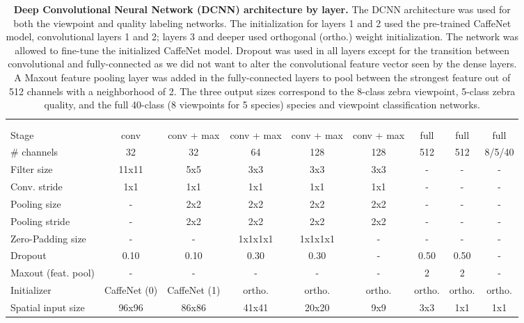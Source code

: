 \begin{table}[!ht]
	\centering
    	\resizebox{\linewidth}{!}
	{
		\begin{tabular}{l|ccccc|cc|c}
			    \hline
			    & & & & & & & & \head{Output} \\
			    \head{Layer} & \head{1} & \head{2} & \head{3} & \head{4} & \head{5} & \head{6} & \head{7} & \head{8} \\
			    \hline
			    Stage & conv & conv + max & conv + max & conv + max & conv + max & full & full & full \\
			    \# channels & 32 & 32 & 64 & 128 & 128 & 512 & 512 & 8/5/40 \\
			    Filter size & 11x11 & 5x5 & 3x3 & 3x3 & 3x3 & - & - & - \\
			    Conv. stride & 1x1 & 1x1 & 1x1 & 1x1 & 1x1 & - & - & - \\
			    Pooling size & - & 2x2 & 2x2 & 2x2 & 2x2 & - & - & - \\
			    Pooling stride & - & 2x2 & 2x2 & 2x2 & 2x2 & - & - & - \\
			    Zero-Padding size & - & - & 1x1x1x1 & 1x1x1x1 & - & - & - & - \\
			    Dropout & 0.10 & 0.10 & 0.30 & 0.30 & - & 0.50 & 0.50 & - \\
			    Maxout (feat. pool) & - & - & - & - & - & 2 & 2 & - \\
			    Initializer & CaffeNet (0) & CaffeNet (1) & ortho. & ortho. & ortho. & ortho. & ortho. & ortho. \\
			    \hline
			    Spatial input size & 96x96 & 86x86 & 41x41 & 20x20 & 9x9 & 3x3 & 1x1 & 1x1 \\
		\end{tabular}
	}
    	\caption[Deep Convolutional Neural Network (DCNN) Architecture by Layer]{\textbf{Deep Convolutional Neural Network (DCNN) architecture by layer.}  The DCNN architecture was used for both the viewpoint and quality labeling networks.  The initialization for layers 1 and 2 used the pre-trained CaffeNet model, convolutional layers 1 and 2; layers 3 and deeper used orthogonal (ortho.) weight initialization.  The network was allowed to fine-tune the initialized CaffeNet model.  Dropout was used in all layers except for the transition between convolutional and fully-connected as we did not want to alter the convolutional feature vector seen by the dense layers.  A Maxout feature pooling layer was added in the fully-connected layers to pool between the strongest feature out of 512 channels with a neighborhood of 2.  The three output sizes correspond to the 8-class zebra viewpoint, 5-class zebra quality, and the full 40-class (8 viewpoints for 5 species) species and viewpoint classification networks.}
    	\label{tab:architecture}
\end{table}

